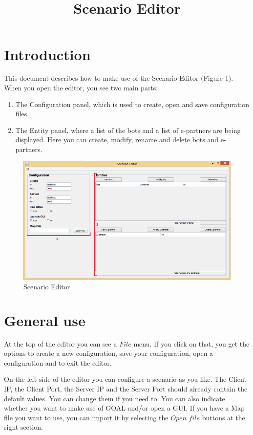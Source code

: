 \documentclass[a4paper]{article}
\title{Scenario Editor}
\date{}
\begin{document}
\maketitle
\newpage

\tableofcontents
\newpage

\section{Introduction}
This document describes how to make use of the Scenario Editor (Figure 1). When you open the editor, you see two main parts:
\begin{enumerate}
\item The Configuration panel, which is used to create, open and save configuration files.
\item The Entity panel, where a list of the bots and a list of e-partners are being displayed. Here you can create, modify, rename and delete bots and e-partners.
\end{enumerate}

\begin{figure}
\includegraphics{editor.png}
\caption{Scenario Editor}
\end{figure}

\section{General use}
At the top of the editor you can see a $File$ menu. If you click on that, you get the options to create a new configuration, save your configuration, open a configuration and to exit the editor.

On the left side of the editor you can configure a scenario as you like. The Client IP, the Client Port, the Server IP and the Server Port should already contain the default values. You can change them if you need to. You can also indicate whether you want to make use of GOAL and/or open a GUI. If you have a Map file you want to use, you can import it by selecting the $Open$ $file$ buttons at the right section.
\end{document}
